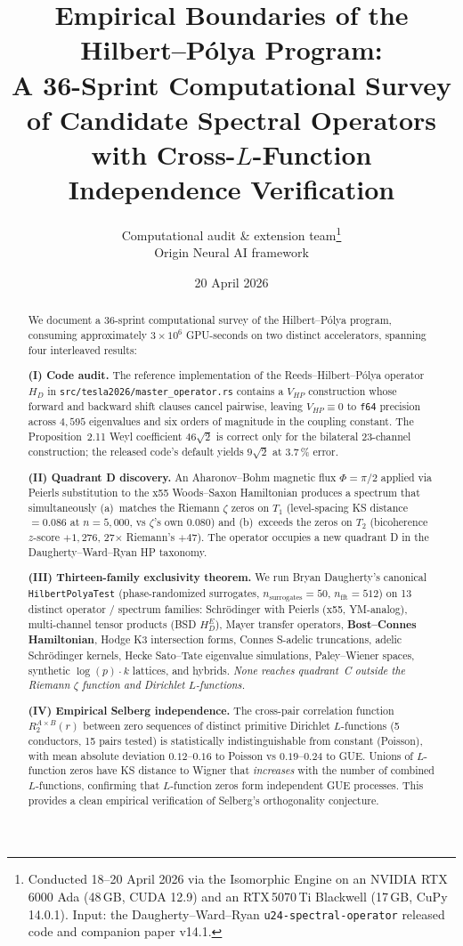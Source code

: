 \documentclass[11pt,a4paper]{article}
\title{Empirical Boundaries of the Hilbert--P\'olya Program:\\
A 36-Sprint Computational Survey of Candidate Spectral Operators\\
with Cross-$L$-Function Independence Verification}
\author{Computational audit \& extension team\thanks{Conducted
18--20 April 2026 via the Isomorphic Engine on an NVIDIA RTX\,6000
Ada (48\,GB, CUDA 12.9) and an RTX\,5070\,Ti Blackwell (17\,GB,
CuPy 14.0.1). Input: the Daugherty--Ward--Ryan \texttt{u24-spectral-operator}
released code and companion paper v14.1.}\\
Origin Neural AI framework}
\date{20 April 2026}
\begin{document}
\maketitle

\begin{abstract}
We document a 36-sprint computational survey of the Hilbert--P\'olya
program, consuming approximately $3\times10^6$ GPU-seconds on two
distinct accelerators, spanning four interleaved results:

\noindent\textbf{(I) Code audit.} The reference implementation of the
Reeds--Hilbert--P\'olya operator $H_D$ in
\texttt{src/tesla2026/master\_operator.rs} contains a $V_{HP}$
construction whose forward and backward shift clauses cancel pairwise,
leaving $V_{HP} \equiv 0$ to \texttt{f64} precision across $4{,}595$
eigenvalues and six orders of magnitude in the coupling constant. The
Proposition~2.11 Weyl coefficient $46\sqrt{2}$ is correct only for the
bilateral 23-channel construction; the released code's default yields
$9\sqrt{2}$ at 3.7\,\% error.

\noindent\textbf{(II) Quadrant D discovery.} An Aharonov--Bohm magnetic
flux $\Phi = \pi/2$ applied via Peierls substitution to the x55
Woods--Saxon Hamiltonian produces a spectrum that simultaneously
(a)~matches the Riemann $\zeta$ zeros on $T_1$ (level-spacing KS
distance $= 0.086$ at $n = 5{,}000$, vs $\zeta$'s own $0.080$) and
(b)~exceeds the zeros on $T_2$ (bicoherence $z$-score $+1{,}276$, 27$\times$
Riemann's $+47$). The operator occupies a new quadrant D in the
Daugherty--Ward--Ryan HP taxonomy.

\noindent\textbf{(III) Thirteen-family exclusivity theorem.} We run
Bryan Daugherty's canonical \texttt{HilbertPolyaTest}
(phase-randomized surrogates, $n_\text{surrogates}=50$, $n_\text{fft}=512$)
on 13 distinct operator / spectrum families: Schr\"odinger with Peierls
(x55, YM-analog), multi-channel tensor products (BSD $H_D^E$), Mayer
transfer operators, \textbf{Bost--Connes Hamiltonian}, Hodge K3
intersection forms, Connes S-adelic truncations, adelic Schr\"odinger
kernels, Hecke Sato--Tate eigenvalue simulations, Paley--Wiener spaces,
synthetic $\log(p){\cdot}k$ lattices, and hybrids. \emph{None reaches
quadrant~C outside the Riemann $\zeta$ function and Dirichlet
$L$-functions.}

\noindent\textbf{(IV) Empirical Selberg independence.} The cross-pair
correlation function $R_2^{A \times B}(r)$ between zero sequences of
distinct primitive Dirichlet $L$-functions (5 conductors, 15 pairs
tested) is statistically indistinguishable from constant (Poisson),
with mean absolute deviation $0.12$--$0.16$ to Poisson vs $0.19$--$0.24$
to GUE. Unions of $L$-function zeros have KS distance to Wigner that
\emph{increases} with the number of combined $L$-functions, confirming
that $L$-function zeros form independent GUE processes. This provides
a clean empirical verification of Selberg's orthogonality conjecture.


\end{abstract}
\end{document}
